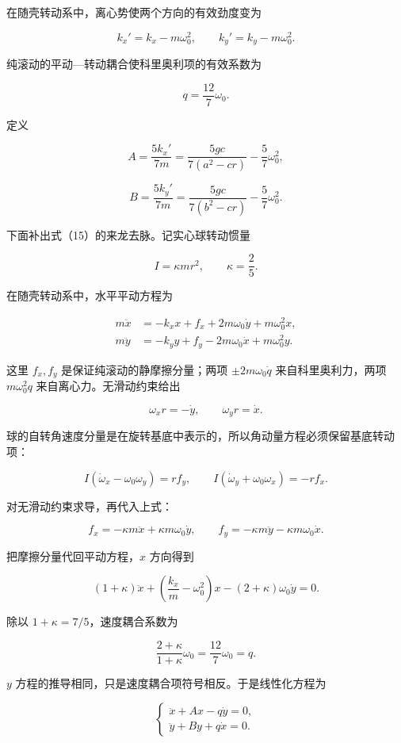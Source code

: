 \documentclass[12pt,a4paper,UTF8]{ctexart}
\begin{document}
在随壳转动系中，离心势使两个方向的有效劲度变为

\[
k_x'=k_x-m\omega_0^2,
\qquad
k_y'=k_y-m\omega_0^2.
\tag{14}
\]

纯滚动的平动---转动耦合使科里奥利项的有效系数为

\[
q=\frac{12}{7}\omega_0.
\tag{15}
\]

定义

\[
A=\frac{5k_x'}{7m}
=\frac{5gc}{7(a^2-cr)}-\frac57\omega_0^2,
\tag{16}
\]

\[
B=\frac{5k_y'}{7m}
=\frac{5gc}{7(b^2-cr)}-\frac57\omega_0^2.
\tag{17}
\]

下面补出式（15）的来龙去脉。记实心球转动惯量

\[
I=\kappa mr^2,
\qquad
\kappa=\frac25.
\]

在随壳转动系中，水平平动方程为

\[
\begin{aligned}
m\ddot x
&=-k_xx+f_x+2m\omega_0\dot y+m\omega_0^2x,\\
m\ddot y
&=-k_yy+f_y-2m\omega_0\dot x+m\omega_0^2y.
\end{aligned}
\]

这里 \(f_x,f_y\) 是保证纯滚动的静摩擦分量；两项 \(\pm2m\omega_0\dot q\)
来自科里奥利力，两项 \(m\omega_0^2q\) 来自离心力。无滑动约束给出

\[
\omega_xr=-\dot y,
\qquad
\omega_yr=\dot x.
\]

球的自转角速度分量是在旋转基底中表示的，所以角动量方程必须保留基底转动项：

\[
I(\dot\omega_x-\omega_0\omega_y)=rf_y,
\qquad
I(\dot\omega_y+\omega_0\omega_x)=-rf_x.
\]

对无滑动约束求导，再代入上式：

\[
f_x=-\kappa m\ddot x+\kappa m\omega_0\dot y,
\qquad
f_y=-\kappa m\ddot y-\kappa m\omega_0\dot x.
\]

把摩擦分量代回平动方程，\(x\) 方向得到

\[
(1+\kappa)\ddot x
+\left(\frac{k_x}{m}-\omega_0^2\right)x
-(2+\kappa)\omega_0\dot y=0.
\]

除以 \(1+\kappa=7/5\)，速度耦合系数为

\[
\frac{2+\kappa}{1+\kappa}\omega_0
=\frac{12}{7}\omega_0=q.
\]

\(y\) 方程的推导相同，只是速度耦合项符号相反。于是线性化方程为

\[
\boxed{
\begin{cases}
\ddot x+A x-q\dot y=0,\\
\ddot y+B y+q\dot x=0.
\end{cases}
}
\tag{18}
\]
\end{document}
